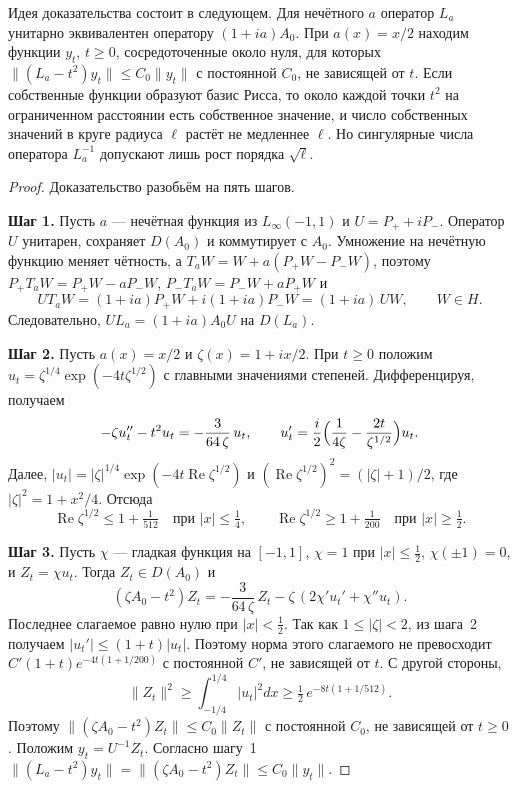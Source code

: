 \documentclass[12pt,a4paper]{article}
\theoremstyle{definition}
\newcommand{\step}[1]{\smallskip\noindent\textbf{Шаг #1.}}
\newcommand{\norm}[1]{\lVert#1\rVert}
\newcommand{\abs}[1]{\lvert#1\rvert}
\begin{document}
Идея доказательства состоит в следующем. Для нечётного $a$ оператор $L_a$ унитарно
эквивалентен оператору $(1+ia)A_0$. При $a(x)=x/2$ находим функции $y_t$, $t\ge0$,
сосредоточенные около нуля, для которых $\norm{(L_a-t^2)y_t}\le C_0\norm{y_t}$ с
постоянной $C_0$, не зависящей от $t$. Если собственные функции образуют базис Рисса, то
около каждой точки $t^2$ на ограниченном расстоянии есть собственное значение, и число
собственных значений в круге радиуса $\ell$ растёт не медленнее $\ell$. Но сингулярные
числа оператора $L_a^{-1}$ допускают лишь рост порядка $\sqrt\ell$.

\begin{proof}
Доказательство разобьём на пять шагов.

\step{1} Пусть $a$ --- нечётная функция из $L_\infty(-1,1)$ и $U=P_++iP_-$. Оператор $U$
унитарен, сохраняет $D(A_0)$ и коммутирует с $A_0$. Умножение на нечётную функцию меняет
чётность, а $T_aW=W+a(P_+W-P_-W)$, поэтому $P_+T_aW=P_+W-aP_-W$,
$P_-T_aW=P_-W+aP_+W$ и
\[
 UT_aW=(1+ia)P_+W+i(1+ia)P_-W=(1+ia)\,UW,\qquad W\in H .
\]
Следовательно, $UL_a=(1+ia)A_0U$ на $D(L_a)$.

\step{2} Пусть $a(x)=x/2$ и $\zeta(x)=1+ix/2$. При $t\ge0$ положим
$u_t=\zeta^{1/4}\exp(-4t\zeta^{1/2})$ с главными значениями степеней. Дифференцируя,
получаем
\[
 -\zeta u_t''-t^2u_t=-\frac3{64\,\zeta}\,u_t,\qquad
 u_t'=\frac i2\Bigl(\frac1{4\zeta}-\frac{2t}{\zeta^{1/2}}\Bigr)u_t .
\]
Далее, $\abs{u_t}=\abs\zeta^{1/4}\exp(-4t\operatorname{Re}\zeta^{1/2})$ и
$(\operatorname{Re}\zeta^{1/2})^2=(\abs\zeta+1)/2$, где $\abs\zeta^2=1+x^2/4$. Отсюда
\[
 \operatorname{Re}\zeta^{1/2}\le1+\tfrac1{512}\quad\text{при }\abs x\le\tfrac14,\qquad
 \operatorname{Re}\zeta^{1/2}\ge1+\tfrac1{200}\quad\text{при }\abs x\ge\tfrac12 .
\]

\step{3} Пусть $\chi$ --- гладкая функция на $[-1,1]$, $\chi=1$ при
$\abs x\le\tfrac12$, $\chi(\pm1)=0$, и $Z_t=\chi u_t$. Тогда $Z_t\in D(A_0)$ и
\[
 (\zeta A_0-t^2)Z_t=-\frac3{64\,\zeta}\,Z_t-\zeta\,(2\chi'u_t'+\chi''u_t).
\]
Последнее слагаемое равно нулю при $\abs x<\tfrac12$. Так как $1\le\abs\zeta<2$, из
шага~2 получаем $\abs{u_t'}\le(1+t)\abs{u_t}$. Поэтому норма этого слагаемого не
превосходит $C'(1+t)e^{-4t(1+1/200)}$ с постоянной $C'$, не зависящей от $t$. С другой
стороны,
\[
 \norm{Z_t}^2\ge\int_{-1/4}^{1/4}\abs{u_t}^2dx\ge\tfrac12\,e^{-8t(1+1/512)} .
\]
Поэтому $\norm{(\zeta A_0-t^2)Z_t}\le C_0\norm{Z_t}$ с постоянной $C_0$, не зависящей от
$t\ge0$. Положим $y_t=U^{-1}Z_t$. Согласно шагу~1
$\norm{(L_a-t^2)y_t}=\norm{(\zeta A_0-t^2)Z_t}\le C_0\norm{y_t}$.


\end{proof}
\end{document}
